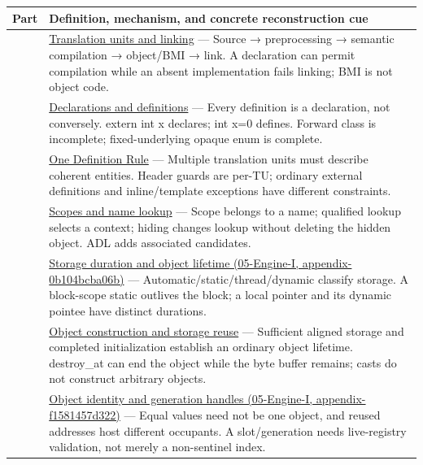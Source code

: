 {\def\LTcaptype{none} %
\begin{longtable}[]{@{}
  >{\raggedright\arraybackslash}p{}
  >{\raggedright\arraybackslash}p{}@{}}
\toprule\noalign{}
\begin{minipage}[b]{\linewidth}\raggedright
Part
\end{minipage} & \begin{minipage}[b]{\linewidth}\raggedright
Definition, mechanism, and concrete reconstruction cue
\end{minipage} \\
\midrule\noalign{}
\endhead
\bottomrule\noalign{}
\endlastfoot
101 & \hyperref[appendix-806686359e1b]{Translation units and linking} --- Source → preprocessing → semantic compilation → object/BMI → link. A declaration can permit compilation while an absent implementation fails linking; BMI is not object code. \\
102 & \hyperref[appendix-2e4d494c2d94]{Declarations and definitions} --- Every definition is a declaration, not conversely. extern int x declares; int x=0 defines. Forward class is incomplete; fixed-underlying opaque enum is complete. \\
103 & \hyperref[appendix-49d27bc9d9a5]{One Definition Rule} --- Multiple translation units must describe coherent entities. Header guards are per-TU; ordinary external definitions and inline/template exceptions have different constraints. \\
104 & \hyperref[appendix-b12b31759da1]{Scopes and name lookup} --- Scope belongs to a name; qualified lookup selects a context; hiding changes lookup without deleting the hidden object. ADL adds associated candidates. \\
105 & \href{}{Storage duration and object lifetime (05-Engine-I, appendix-0b104bcba06b)} --- Automatic/static/thread/dynamic classify storage. A block-scope static outlives the block; a local pointer and its dynamic pointee have distinct durations. \\
106 & \hyperref[appendix-a82f9c438857]{Object construction and storage reuse} --- Sufficient aligned storage and completed initialization establish an ordinary object lifetime. destroy\_at can end the object while the byte buffer remains; casts do not construct arbitrary objects. \\
107 & \href{}{Object identity and generation handles (05-Engine-I, appendix-f1581457d322)} --- Equal values need not be one object, and reused addresses host different occupants. A slot/generation needs live-registry validation, not merely a non-sentinel index. \\

\end{longtable}}
